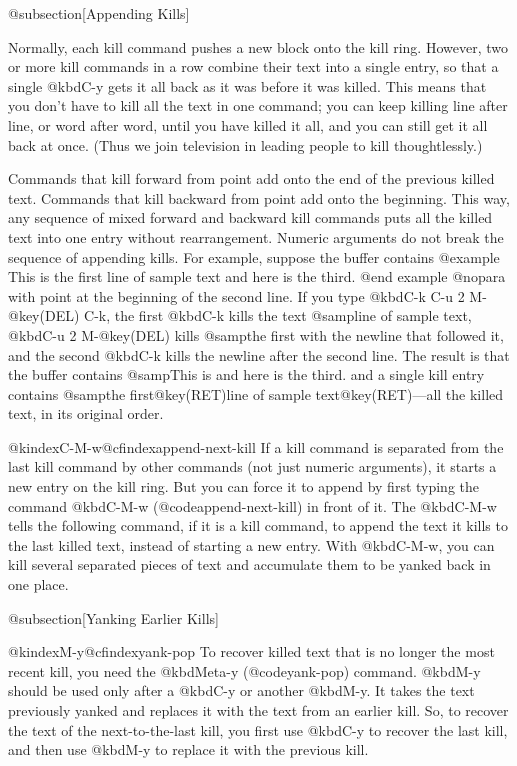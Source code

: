 {{{{{{@subsection[Appending Kills]

  Normally, each kill command pushes a new block onto the kill ring.
However, two or more kill commands in a row combine their text into a
single entry, so that a single @kbd{C-y} gets it all back as it was
before it was killed.  This means that you don't have to kill all the text
in one command; you can keep killing line after line, or word after word,
until you have killed it all, and you can still get it all back at once.
(Thus we join television in leading people to kill thoughtlessly.)

  Commands that kill forward from point add onto the end of the previous
killed text.  Commands that kill backward from point add onto the
beginning.  This way, any sequence of mixed forward and backward kill
commands puts all the killed text into one entry without rearrangement.
Numeric arguments do not break the sequence of appending kills.  For
example, suppose the buffer contains
@example
This is the first
line of sample text
and here is the third.
@end example
@nopara
with point at the beginning of the second line.  If you type
@kbd{C-k C-u 2 M-@key(DEL) C-k}, the first @kbd{C-k} kills the text
@samp{line of sample text}, @kbd{C-u 2 M-@key(DEL)} kills @samp{the first}
with the newline that followed it, and the second @kbd{C-k} kills the
newline after the second line.  The result is that the buffer contains
@samp{This is and here is the third.} and a single kill entry contains
@samp{the first@key(RET)line of sample text@key(RET)}---all the
killed text, in its original order.

@kindex{C-M-w}@cfindex{append-next-kill}
  If a kill command is separated from the last kill command by other
commands (not just numeric arguments), it starts a new entry on the kill
ring.  But you can force it to append by first typing the command
@kbd{C-M-w} (@code{append-next-kill}) in front of it.  The @kbd{C-M-w}
tells the following command, if it is a kill command, to append the text it
kills to the last killed text, instead of starting a new entry.  With
@kbd{C-M-w}, you can kill several separated pieces of text and accumulate
them to be yanked back in one place.

@subsection[Yanking Earlier Kills]

@kindex{M-y}@cfindex{yank-pop}
  To recover killed text that is no longer the most recent kill, you need
the @kbd{Meta-y} (@code{yank-pop}) command.  @kbd{M-y} should
be used only after a @kbd{C-y} or another @kbd{M-y}.  It takes the
text previously yanked and replaces it with the text from an earlier kill.
So, to recover the text of the next-to-the-last kill, you first use
@kbd{C-y} to recover the last kill, and then use @kbd{M-y} to replace it
with the previous kill.

}}}}}}
